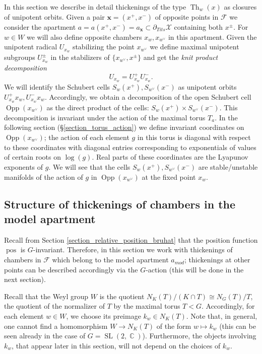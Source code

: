 \documentclass[12pt]{amsbook}%
\theoremstyle{definition}
\theoremstyle{remark}
\numberwithin{section}{chapter}
\numberwithin{subsection}{section}
\numberwithin{figure}{chapter}
\DeclareMathOperator{\C}{\mathbb{C}}
\DeclareMathOperator{\SL}{SL}
\DeclareMathOperator{\Th}{Th}
\DeclareMathOperator{\Opp}{Opp}
\DeclareMathOperator{\pos}{pos}
\def\tits{\partial_{Tits}}
\def\amod{a_{mod}}
\def\cF{{\mathscr{F}}}
\def\cX{{\mathscr{X}}}
\def\bx{\mathbf{x}}
\def\mini{\scriptsize}
\begin{document}
{{In this section we describe in detail thickenings of the type $\Th_w(x)$ as closures of unipotent orbits. Given a pair $\bx=(x^+,x^-)$ of  
opposite points in $\cF$ we consider the apartment $a=a(x^+,x^-)=a_{\bx}\subset \tits \cX$ 
containing both $x^\pm$. For $w\in W$ we will also define opposite chambers $x_{w}, x_{w^\vee}$ in this apartment. 
Given the unipotent radical $U_{x_w}$ stabilizing the point $x_{w^\vee}$ we define maximal 
unipotent subgroups $U_{x_w}^\pm$ in the stabilizers of $\{x_{w^\vee}, x^\pm\}$ 
and get the {\em knit product decomposition}
$$
U_{x_w}= U_{x_w}^+ U_{x_w}^-. 
$$
We will identify the Schubert cells $S_w(x^+), S_{w^\vee}(x^-)$ as unipotent orbits $U_{x_w}^+ x_w, U_{x_w}^- x_w$. 
Accordingly, we obtain a decomposition of the open Schubert cell $\Opp(x_{w^\vee})$ as the direct 
product of the cells:  $S_w(x^+)\times S_{w^\vee}(x^-)$. This decomposition is invariant under the action of the maximal torus $T_a$.  
 In the following section (\S \ref{section_torus_action}) 
we define invariant coordinates on 
$\Opp(x_{w^\vee})$; the action of each element $g$ in this torus is diagonal with respect to these coordinates 
with diagonal entries corresponding to exponentials of values of certain roots on $\log(g)$. Real parts of these coordinates are the Lyapunov exponents of $g$. We will see that the cells $S_w(x^+), S_{w^\vee}(x^-)$ are stable/unstable manifolds of the action of $g$ in $\Opp(x_{w^\vee})$ at the fixed point $x_w$.   



\subsection{Structure of thickenings of chambers in the model apartment}\label{sec:Structure of thickenings}

Recall from Section \ref{section_relative_position_bruhat} that the position function $\pos$ 
is $G$-invariant. Therefore, in this section we work with thickenings of 
chambers in $\cF$ which belong to the model apartment $\amod$;  thickenings at other points can be 
described accordingly via the $G$-action (this will be done in the next section).

Recall that the Weyl group $W$ is the quotient $N_K(T)/(K\cap T)\cong N_G(T)/T$, the quotient of the normalizer of $T$ by the maximal torus $T< G$. 
 Accordingly, for each element $w \in W$, we choose its preimage $k_w\in N_K(T)$. 
 Note that, in general, one cannot find a homomorphism $W\to N_K(T)$ of the form $w\mapsto k_w$ (this can be seen already in the case of $G=\SL(2,\C)$). Furthermore, 
 the objects involving $k_w$, that appear later in this section,  will not depend on the choices of $k_w$. 
 
}}
\end{document}
